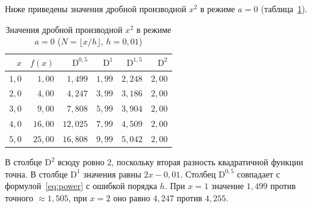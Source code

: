 \documentclass[14pt,a4paper]{extarticle}
\newcommand{\D}{\mathrm{D}}
\begin{document}
Ниже приведены значения дробной производной $x^2$ в режиме $a=0$ (таблица~\ref{tab:x2}).

\begin{table}[htbp]
\centering
\caption{Значения дробной производной $x^2$ в режиме $a=0$ ($N=\lfloor x/h\rfloor$, $h=0{,}01$)}
\label{tab:x2}
\begin{tabular}{|r|r|r|r|r|r|}
\hline
$x$ & $f(x)$ & $\D^{0{,}5}$ & $\D^{1}$ & $\D^{1{,}5}$ & $\D^{2}$ \\
\hline
$1{,}0$ & $1{,}00$  & $1{,}499$  & $1{,}99$ & $2{,}248$ & $2{,}00$ \\
\hline
$2{,}0$ & $4{,}00$  & $4{,}247$  & $3{,}99$ & $3{,}186$ & $2{,}00$ \\
\hline
$3{,}0$ & $9{,}00$  & $7{,}808$  & $5{,}99$ & $3{,}904$ & $2{,}00$ \\
\hline
$4{,}0$ & $16{,}00$ & $12{,}025$ & $7{,}99$ & $4{,}509$ & $2{,}00$ \\
\hline
$5{,}0$ & $25{,}00$ & $16{,}808$ & $9{,}99$ & $5{,}042$ & $2{,}00$ \\
\hline
\end{tabular}
\end{table}

В столбце $\D^2$ всюду ровно $2$, поскольку вторая разность квадратичной функции точна. В столбце $\D^1$ значения равны $2x-0{,}01$. Столбец $\D^{0{,}5}$ совпадает с формулой~\eqref{eq:power} с ошибкой порядка $h$. При $x=1$ значение $1{,}499$ против точного $\approx1{,}505$, при $x=2$ оно равно $4{,}247$ против $4{,}255$.
\end{document}
